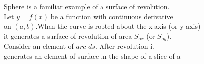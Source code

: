 \documentclass[a4paper,11pt]{amsbook}
\begin{document}
Sphere is a familiar example of a surface of revolution.\\

Let $y=f(x)$ be a function with continuous derivative\\
on $(a,b)$.When the curve is rooted about the x-axis (or y-axis)\\
it generates a surface of revolution of area $S_{ox}$ (or $S_{oy}$).\\

Consider an element of $arc$ $ds$. After revolution it \\generates an element of surface in the shape of a slice of a
\end{document}
